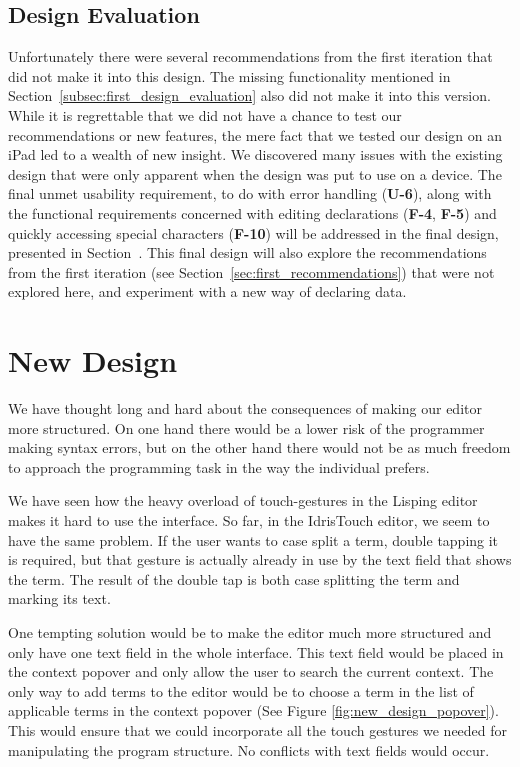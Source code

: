\subsection{Design Evaluation}
\label{second_design_evaluation}
Unfortunately there were several recommendations from the first iteration that did not make it into this design. 
The missing functionality mentioned in Section~\ref{subsec:first_design_evaluation} also did not make it into this version.
While it is regrettable that we did not have a chance to test our recommendations or new features, the mere fact that we tested our design on an iPad led to a wealth of new insight.
We discovered many issues with the existing design that were only apparent when the design was put to use on a device. 
The final unmet usability requirement, to do with error handling (\textbf{U-6}), along with the functional requirements concerned with editing declarations (\textbf{F-4}, \textbf{F-5}) and quickly accessing special characters (\textbf{F-10}) will be addressed in the final design, presented in Section~. 
This final design will also explore the recommendations from the first iteration (see Section~\ref{sec:first_recommendations}) that were not explored here, and experiment with a new way of declaring data.

\section{New Design}
We have thought long and hard about the consequences of making our editor more
structured. On one hand there would be a lower risk of the programmer making  syntax errors, but on the other hand there would not be as much freedom to approach
the programming task in the way the individual prefers.

We have seen how the heavy overload of touch-gestures in the Lisping editor makes it hard to use
the interface. So far, in the IdrisTouch editor, we seem to have the same
problem. If the user wants to case split a term, double tapping it is required,
but that gesture is actually already in use by the text field that shows the
term. The result of the double tap is both case splitting the term and marking
its text.

One tempting solution would be to make the editor much more structured and only
have one text field in the whole interface. This text field would be placed in
the context popover and only allow the user to search the current context. The only way to add terms to the editor would be to choose a term in the list of applicable terms in the context popover (See Figure \ref{fig:new_design_popover}). This
would ensure that we could incorporate all the touch gestures we needed for
manipulating the program structure. No conflicts with text fields would occur.

